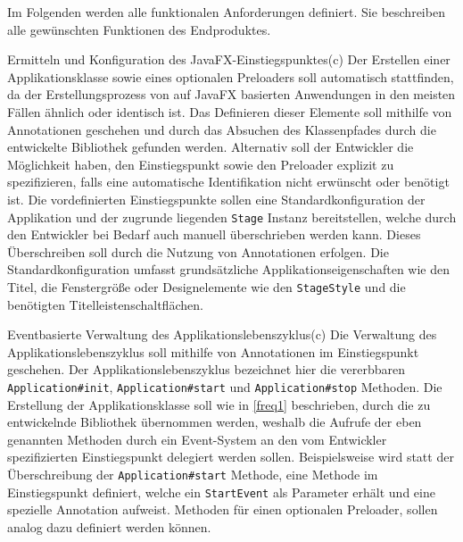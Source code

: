 Im Folgenden werden alle funktionalen Anforderungen definiert. Sie beschreiben alle gewünschten Funktionen des Endproduktes.
\begin{freq}{Ermitteln und Konfiguration des JavaFX-Einstiegspunktes}(c)
	Der Erstellen einer Applikationsklasse sowie eines optionalen Preloaders soll automatisch stattfinden, da der Erstellungsprozess von auf JavaFX basierten Anwendungen in den meisten Fällen ähnlich oder identisch ist. Das Definieren dieser Elemente soll mithilfe von Annotationen geschehen und durch das Absuchen des Klassenpfades durch die entwickelte Bibliothek gefunden werden. Alternativ soll der Entwickler die Möglichkeit haben, den Einstiegspunkt sowie den Preloader explizit zu spezifizieren, falls eine automatische Identifikation nicht erwünscht oder benötigt ist. Die vordefinierten Einstiegspunkte sollen eine Standardkonfiguration der Applikation und der zugrunde liegenden \texttt{Stage} Instanz bereitstellen, welche durch den Entwickler bei Bedarf auch manuell überschrieben werden kann. Dieses Überschreiben soll durch die Nutzung von Annotationen erfolgen. Die Standardkonfiguration umfasst grundsätzliche Applikationseigenschaften wie den Titel, die Fenstergröße oder Designelemente wie den \texttt{StageStyle} und die benötigten Titelleistenschaltflächen.
\end{freq}
\begin{freq}{Eventbasierte Verwaltung des Applikationslebenszyklus}(c)
	Die Verwaltung des Applikationslebenszyklus soll mithilfe von Annotationen im Einstiegspunkt geschehen. Der Applikationslebenszyklus bezeichnet hier die vererbbaren \texttt{Application\#init}, \texttt{Application\#start} und \texttt{Application\#stop} Methoden. Die Erstellung der Applikationsklasse soll wie in \autoref{freq1} beschrieben, durch die zu entwickelnde Bibliothek übernommen werden, weshalb die Aufrufe der eben genannten Methoden durch ein Event-System an den vom Entwickler spezifizierten Einstiegspunkt delegiert werden sollen. Beispielsweise wird statt der Überschreibung der \texttt{Application\#start} Methode, eine Methode im Einstiegspunkt definiert, welche ein \texttt{StartEvent} als Parameter erhält und eine spezielle Annotation aufweist. Methoden für einen optionalen Preloader, sollen analog dazu definiert werden können.
\end{freq}
